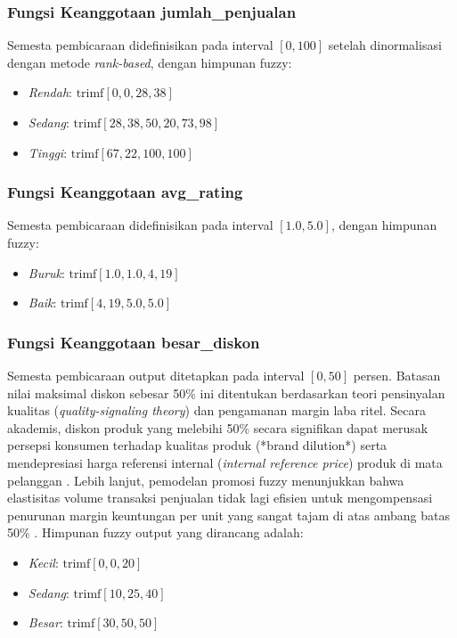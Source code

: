 \documentclass[conference]{IEEEtran}
\begin{document}
\subsubsection{Fungsi Keanggotaan jumlah\_penjualan}
Semesta pembicaraan didefinisikan pada interval $[0, 100]$ setelah dinormalisasi dengan metode \textit{rank-based}, dengan himpunan fuzzy:
\begin{itemize}
    \item \textit{Rendah}: $\text{trimf}[0, 0, 28,38]$
    \item \textit{Sedang}: $\text{trimf}[28,38, 50,20, 73,98]$
    \item \textit{Tinggi}: $\text{trimf}[67,22, 100, 100]$
\end{itemize}

\subsubsection{Fungsi Keanggotaan avg\_rating}
Semesta pembicaraan didefinisikan pada interval $[1.0, 5.0]$, dengan himpunan fuzzy:
\begin{itemize}
    \item \textit{Buruk}: $\text{trimf}[1.0, 1.0, 4,19]$
    \item \textit{Baik}: $\text{trimf}[4,19, 5.0, 5.0]$
\end{itemize}

\subsubsection{Fungsi Keanggotaan besar\_diskon}
Semesta pembicaraan output ditetapkan pada interval $[0, 50]$ persen. Batasan nilai maksimal diskon sebesar 50\% ini ditentukan berdasarkan teori pensinyalan kualitas (\textit{quality-signaling theory}) dan pengamanan margin laba ritel. Secara akademis, diskon produk yang melebihi 50\% secara signifikan dapat merusak persepsi konsumen terhadap kualitas produk (*brand dilution*) serta mendepresiasi harga referensi internal (\textit{internal reference price}) produk di mata pelanggan \cite{petrovic2019, zhang2023}. Lebih lanjut, pemodelan promosi fuzzy menunjukkan bahwa elastisitas volume transaksi penjualan tidak lagi efisien untuk mengompensasi penurunan margin keuntungan per unit yang sangat tajam di atas ambang batas 50\% \cite{kumar2016}. Himpunan fuzzy output yang dirancang adalah:
\begin{itemize}
    \item \textit{Kecil}: $\text{trimf}[0, 0, 20]$
    \item \textit{Sedang}: $\text{trimf}[10, 25, 40]$
    \item \textit{Besar}: $\text{trimf}[30, 50, 50]$
\end{itemize}
\end{document}

